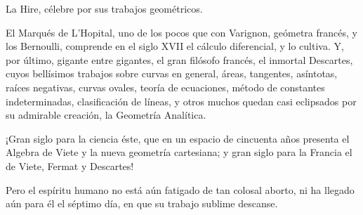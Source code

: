 \documentclass[a4paper, 12pt]{article}
\begin{document}
{{{{La Hire, célebre por sus trabajos geométricos.

El Marqués de L'Hopital, uno de los pocos que con Varignon, geómetra francés, y los Bernoulli, comprende en el siglo XVII el cálculo diferencial, y lo cultiva.  Y, por último, gigante entre gigantes, el gran filósofo francés, el inmortal Descartes, cuyos bellísimos trabajos sobre curvas en general, áreas, tangentes, asíntotas, raíces negativas, curvas ovales, teoría de ecuaciones, método de constantes indeterminadas, clasificación de líneas, y otros muchos quedan casi eclipsados por su admirable creación, la Geometría Analítica.

¡Gran siglo para la ciencia éste, que en un espacio de cincuenta años presenta el Algebra de Viete y la nueva geometría cartesiana; y gran siglo para la Francia el de Viete, Fermat y Descartes!

Pero el espíritu humano no está aún fatigado de tan colosal aborto, ni ha llegado aún para él el séptimo día, en que su trabajo sublime descanse.

}}}}
\end{document}
